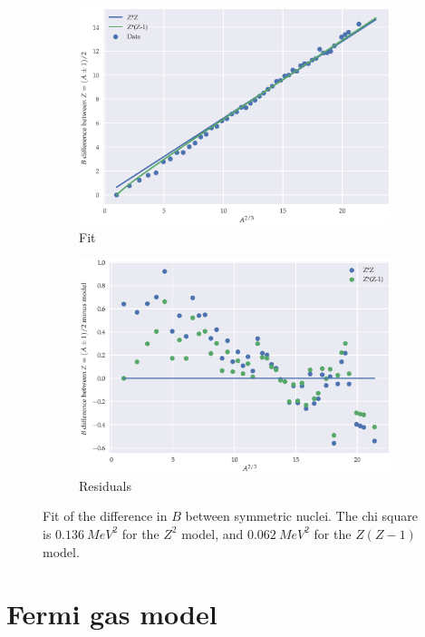 \documentclass{article}
\begin{document}
\begin{figure}[H]
    \centering
    \begin{subfigure}{0.5\textwidth}
        \includegraphics[width=\textwidth]{../figures/odd_A_fit.eps}
        \caption{Fit}
    \end{subfigure}%
    \begin{subfigure}{0.5\textwidth}
        \includegraphics[width=\textwidth]{../figures/odd_A_residuals.eps}
        \caption{Residuals}
    \end{subfigure}%
    \caption{Fit of the difference in \(B\) between symmetric nuclei. The chi square is \(\SI{0.136}{MeV^2} \) for the \(Z^2\) model, and \(\SI{0.062}{MeV^2}\) for the \(Z(Z-1)\) model.}
    \label{fig:odd-A-fit}
\end{figure}

\section{Fermi gas model}
\end{document}
